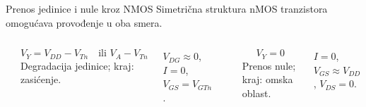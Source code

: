 \begin{frame}[label=09_3-s051]{Prenos jedinice i nule kroz NMOS}
Simetrična struktura nMOS tranzistora omogućava provođenje u oba smera.\begin{columns}[c,onlytextwidth]
\begin{center}

\end{center}\[V_Y=V_{DD}-V_{Tn}\quad\text{ili }V_A-V_{Tn}\]
Degradacija jedinice; kraj: zasićenje.\par
$V_{DG}\approx0$, $I=0$, $V_{GS}=V_{GTn}$.
\begin{center}

\end{center}\[V_Y=0\]
Prenos nule; kraj: omska oblast.\par
$I=0$, $V_{GS}\approx V_{DD}$, $V_{DS}=0$.
\end{columns}
\end{frame}

